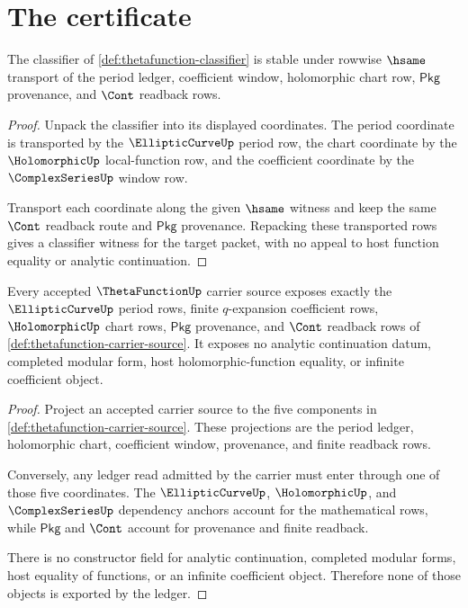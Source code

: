 \section{The certificate}
\label{sec:thetafunction-certificate}

\begin{theorem}
\label{thm:thetafunction-hsame-stability}
The classifier of \autoref{def:thetafunction-classifier} is stable under
rowwise $\hsame$ transport of the period ledger, coefficient window,
holomorphic chart row, $\mathsf{Pkg}$ provenance, and $\Cont$ readback rows.
\end{theorem}
\begin{proof}
Unpack the classifier into its displayed coordinates. The period coordinate is
transported by the $\EllipticCurveUp$ period row, the chart coordinate by the
$\HolomorphicUp$ local-function row, and the coefficient coordinate by the
$\ComplexSeriesUp$ window row.

Transport each coordinate along the given $\hsame$ witness and keep the same
$\Cont$ readback route and $\mathsf{Pkg}$ provenance. Repacking these transported
rows gives a classifier witness for the target packet, with no appeal to host
function equality or analytic continuation.
\end{proof}

\begin{theorem}
\label{thm:thetafunction-ledger-exactness}
Every accepted $\ThetaFunctionUp$ carrier source exposes exactly the
$\EllipticCurveUp$ period rows, finite $q$-expansion coefficient rows,
$\HolomorphicUp$ chart rows, $\mathsf{Pkg}$ provenance, and $\Cont$ readback
rows of \autoref{def:thetafunction-carrier-source}. It exposes no analytic
continuation datum, completed modular form, host holomorphic-function equality,
or infinite coefficient object.
\end{theorem}
\begin{proof}
Project an accepted carrier source to the five components in
\autoref{def:thetafunction-carrier-source}. These projections are the period
ledger, holomorphic chart, coefficient window, provenance, and finite readback
rows.

Conversely, any ledger read admitted by the carrier must enter through one of
those five coordinates. The $\EllipticCurveUp$, $\HolomorphicUp$, and
$\ComplexSeriesUp$ dependency anchors account for the mathematical rows, while
$\mathsf{Pkg}$ and $\Cont$ account for provenance and finite readback.

There is no constructor field for analytic continuation, completed modular
forms, host equality of functions, or an infinite coefficient object. Therefore
none of those objects is exported by the ledger.
\end{proof}

